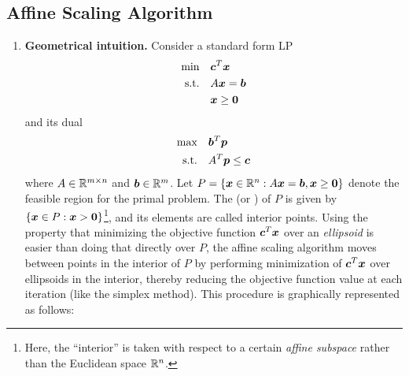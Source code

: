 \subsection{Affine Scaling Algorithm}
\begin{enumerate}
\item \textbf{Geometrical intuition.} Consider a standard form LP
\begin{align*}
\text{min}\quad&\bm{c}^{T}\bm{x} \\
\text{s.t.}\quad&A\bm{x}=\bm{b} \\
&\bm{x}\ge \bm{0}
\end{align*}
and its dual
\begin{align*}
\text{max}\quad&\bm{b}^{T}\bm{p} \\
\text{s.t.}\quad&A^{T}\bm{p}\le\bm{c} \\
\end{align*}
where \(A\in\mathbb{R}^{m\times n}\) and \(\bm{b}\in\mathbb{R}^{m}\). Let
\(P=\{\bm{x}\in\mathbb{R}^n:A\bm{x}=\bm{b},\bm{x}\ge\bm{0}\}\) denote the
feasible region for the primal problem. The  (or ) of \(P\) is given by \(\{\bm{x}\in
P:\bm{x}>\bm{0}\}\)\footnote{Here, the ``interior'' is taken with respect
to a certain \emph{affine subspace} rather than the Euclidean space
\(\mathbb{R}^{n}\).}, and its elements are called interior points. Using the property
that minimizing the objective function \(\bm{c}^{T}\bm{x}\) over an
\emph{ellipsoid} is easier than doing that directly over \(P\), the affine scaling
algorithm moves between points in the interior of \(P\) by performing
minimization of \(\bm{c}^{T}\bm{x}\) over ellipsoids in the interior,
thereby reducing the objective function value at each iteration (like the
simplex method). This procedure is graphically represented as follows:
\begin{center}
\end{center}
\end{enumerate}
